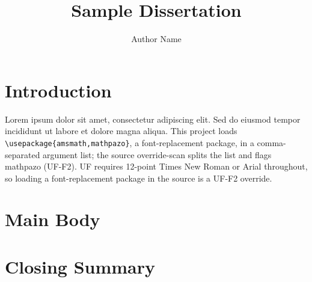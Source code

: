 \documentclass{ufdissertation}
\title{Sample Dissertation}
\author{Author Name}
\begin{document}
\chapter{Introduction}
Lorem ipsum dolor sit amet, consectetur adipiscing elit. Sed do
eiusmod tempor incididunt ut labore et dolore magna aliqua. This
project loads \texttt{\textbackslash{}usepackage\{amsmath,mathpazo\}}, a
font-replacement package, in a comma-separated argument list; the
source override-scan splits the list and flags mathpazo (UF-F2). UF
requires 12-point Times New Roman or Arial throughout, so loading a
font-replacement package in the source is a UF-F2 override.
\chapter{Main Body}
\chapter{Closing Summary}
\end{document}
